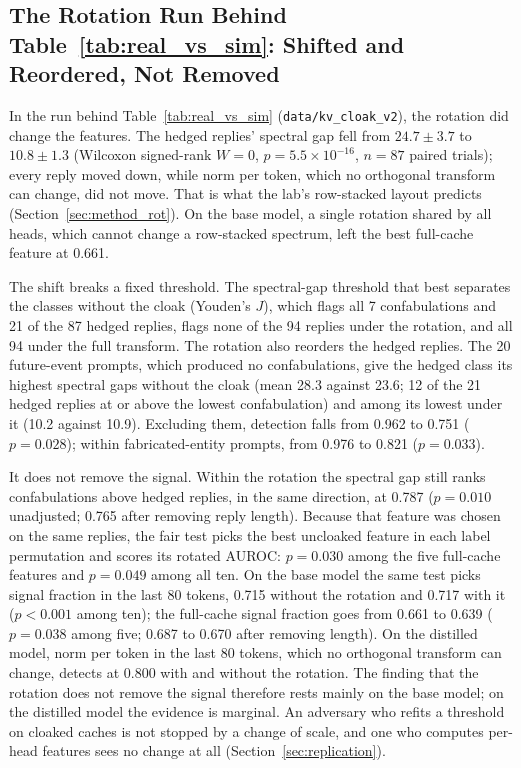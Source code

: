 \documentclass[11pt,a4paper]{article}
\begin{document}
\subsection{\texorpdfstring{The Rotation Run Behind Table~\ref{tab:real_vs_sim}: Shifted and Reordered, Not Removed}{The Rotation Run (data/kv\_cloak\_v2): Shifted and Reordered, Not Removed}}
\label{sec:shift}

In the run behind Table~\ref{tab:real_vs_sim} (\texttt{data/kv\_cloak\_v2}),
the rotation did change the features. The hedged replies' spectral gap
fell from $24.7 \pm 3.7$ to $10.8 \pm 1.3$ (Wilcoxon signed-rank $W = 0$,
$p = 5.5 \times 10^{-16}$, $n = 87$ paired trials); every reply moved
down, while norm per token, which no orthogonal transform can change, did
not move. That is what the lab's row-stacked layout predicts
(Section~\ref{sec:method_rot}). On the base model, a single rotation
shared by all heads, which cannot change a row-stacked spectrum, left the
best full-cache feature at 0.661.

The shift breaks a fixed threshold. The spectral-gap threshold that best
separates the classes without the cloak (Youden's $J$), which flags all 7
confabulations and 21 of the 87 hedged replies, flags none of the 94
replies under the rotation, and all 94 under the full transform. The
rotation also reorders the hedged replies. The 20 future-event prompts,
which produced no confabulations, give the hedged class its highest
spectral gaps without the cloak (mean 28.3 against 23.6; 12 of the 21
hedged replies at or above the lowest confabulation) and among its lowest
under it (10.2 against 10.9). Excluding them, detection falls from 0.962
to 0.751 ($p = 0.028$); within fabricated-entity prompts, from 0.976 to
0.821 ($p = 0.033$).

It does not remove the signal. Within the rotation the spectral gap still
ranks confabulations above hedged replies, in the same direction, at
0.787 ($p = 0.010$ unadjusted; 0.765 after removing reply length).
Because that feature was chosen on the same replies, the fair test picks
the best uncloaked feature in each label permutation and scores its
rotated AUROC: $p = 0.030$ among the five full-cache features and
$p = 0.049$ among all ten. On the base model the same test picks signal
fraction in the last 80 tokens, 0.715 without the rotation and 0.717 with
it ($p < 0.001$ among ten); the full-cache signal fraction goes from
0.661 to 0.639 ($p = 0.038$ among five; 0.687 to 0.670 after removing
length). On the distilled model, norm per token in the last 80 tokens,
which no orthogonal transform can change, detects at 0.800 with and
without the rotation. The finding that the rotation does not remove the
signal therefore rests mainly on the base model; on the distilled model
the evidence is marginal. An
adversary who refits a threshold on cloaked caches is not stopped by a
change of scale, and one who computes per-head features sees no change at
all (Section~\ref{sec:replication}).
\end{document}
